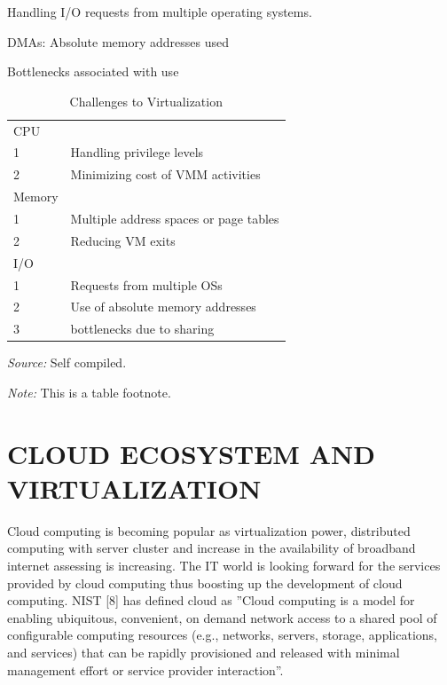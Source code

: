 \begin{description}
\item[Main challenges for I/O virtualization]
\item  Handling I/O requests from multiple operating
systems. 

 DMAs: Absolute memory addresses used
 
 Bottlenecks associated with use
\end{description} 
\begin{table}%
\caption{Challenges to Virtualization}
\label{tab:one}
\begin{minipage}{\columnwidth}
\begin{center}
\begin{tabular}{ll}
  \toprule
  CPU   & \\
  1     & Handling privilege levels\\
  2  & Minimizing cost of VMM activities\\
  Memory     & \\
  1    & Multiple address spaces or page tables\\
  2   & Reducing VM exits\\
  I/O       & \\
  1     & Requests from multiple OSs\\
  2 & Use of absolute memory addresses\\
  3     & bottlenecks due to sharing\\
  \bottomrule
\end{tabular}
\end{center}
\bigskip\centering
\footnotesize\emph{Source:} Self compiled.

 \emph{Note:} This is a table footnote.
\end{minipage}
\end{table}%


\section{CLOUD ECOSYSTEM AND VIRTUALIZATION}

Cloud computing is becoming popular as virtualization power, distributed computing with server cluster
and increase in the availability of broadband internet assessing is increasing.
The IT world is looking forward for the services provided by cloud computing thus boosting up the
development of cloud computing.
NIST [8] has defined cloud as ''Cloud computing is a model for enabling ubiquitous, convenient, on demand
network access to a shared pool of configurable computing resources (e.g., networks, servers, storage,
applications, and services) that can be rapidly provisioned and released with minimal management effort or
service provider interaction''. 

